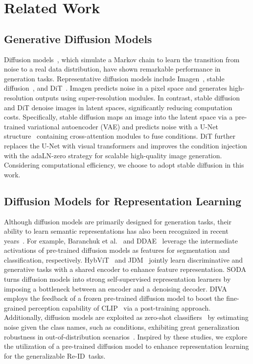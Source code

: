 \section{Related Work}
\subsection{Generative Diffusion Models}
Diffusion models~\cite{DDPM,DDIM}, which simulate a Markov chain to learn the transition from noise to a real data distribution, have shown remarkable performance in generation tasks. Representative diffusion models include Imagen~\cite{Imagen}, stable diffusion~\cite{StableDiffusion}, and DiT~\cite{DiT}. Imagen predicts noise in a pixel space and generates high-resolution outputs using super-resolution modules. In contrast, stable diffusion and DiT denoise images in latent spaces, significantly reducing computation costs. Specifically, stable diffusion maps an image into the latent space via a pre-trained variational autoencoder (VAE) and predicts noise with a U-Net structure~\cite{U-Net} containing cross-attention modules to fuse conditions. DiT further replaces the U-Net with visual transformers and improves the condition injection with the adaLN-zero strategy for scalable high-quality image generation. Considering computational efficiency, we choose to adopt stable diffusion in this work.

\subsection{Diffusion Models for Representation Learning}
Although diffusion models are primarily designed for generation tasks, their ability to learn semantic representations has also been recognized in recent years~\cite{DMRL}. For example, Baranchuk et al.~\cite{DMSS} and DDAE~\cite{DDAE} leverage the intermediate activations of pre-trained diffusion models as features for segmentation and classification, respectively. HybViT~\cite{HybViT} and JDM~\cite{JDM} jointly learn discriminative and generative tasks with a shared encoder to enhance feature representation. 
SODA~\cite{SODA} turns diffusion models into strong self-supervised representation learners by imposing a bottleneck between an encoder and a denoising decoder.
DIVA~\cite{DIVA} employs the feedback of a frozen pre-trained diffusion model to boost the fine-grained perception capability of CLIP~\cite{CLIP} via a post-training approach.
Additionally, diffusion models are exploited as zero-shot classifiers~\cite{li2023your,clark2024text} by estimating noise given the class names, such as conditions, exhibiting great generalization robustness in out-of-distribution scenarios~\cite{jaini2023intriguing}. Inspired by these studies, we explore the utilization of a pre-trained diffusion model to enhance representation learning for the generalizable \mbox{Re-ID tasks.}

